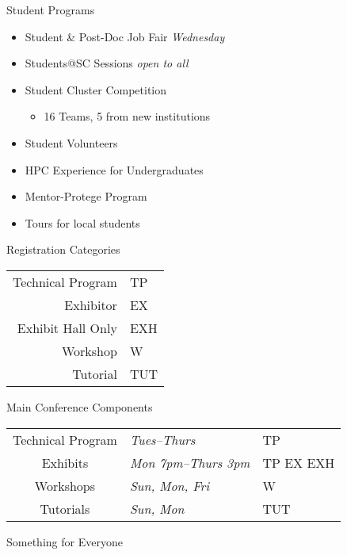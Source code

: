 \documentclass[presentation,xcolor=table]{beamer}
\begin{document}
\begin{frame}[label={sec:org4e7cf48}]{Student Programs}
\begin{itemize}
\item \alert{Student \& Post-Doc Job Fair} \emph{Wednesday}
\item \alert{Students@SC Sessions} \emph{open to all}
\item Student Cluster Competition
\begin{itemize}
\item 16 Teams, 5 from new institutions
\end{itemize}
\item Student Volunteers
\item HPC Experience for Undergraduates
\item Mentor-Protege Program
\item Tours for local students
\end{itemize}
\end{frame}

\begin{frame}[label={sec:orgceef62a}]{Registration Categories}
\begin{center}
\begin{tabular}{rl}
\alert{Technical Program} & \colorbox{sc18 red}{\color{white}TP}\\
\alert{Exhibitor} & \colorbox{sc18 red}{\color{white}EX}\\
\alert{Exhibit Hall Only} & \colorbox{sc18 red}{\color{white}EXH}\\
\alert{Workshop} & \colorbox{sc18 red}{\color{white}W}\\
\alert{Tutorial} & \colorbox{sc18 red}{\color{white}TUT}\\
\end{tabular}
\end{center}
\end{frame}

\begin{frame}[label={sec:org41b66a6}]{Main Conference Components}
\begin{center}
\begin{tabular}{cll}
\alert{Technical Program} & \emph{Tues--Thurs} & \colorbox{sc18 red}{\color{white}TP}\\
\alert{Exhibits} & \emph{Mon 7pm--Thurs 3pm} & \colorbox{sc18 red}{\color{white}TP EX EXH}\\
\alert{Workshops} & \emph{Sun, Mon, Fri} & \colorbox{sc18 red}{\color{white}W}\\
\alert{Tutorials} & \emph{Sun, Mon} & \colorbox{sc18 red}{\color{white}TUT}\\
\end{tabular}
\end{center}

\begin{block}{\centering Something for Everyone}
\end{block}
\end{frame}
\end{document}
